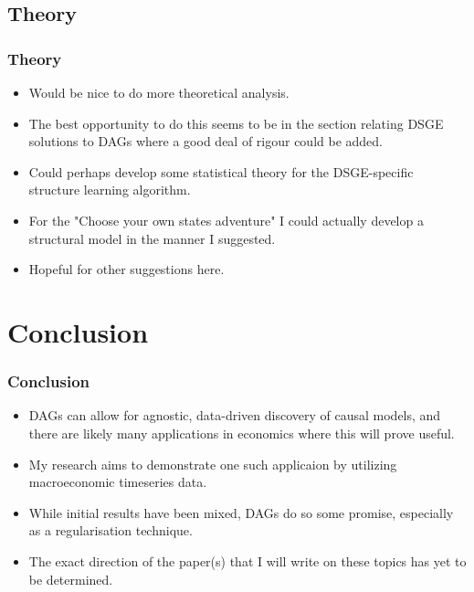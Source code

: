 \documentclass{beamer}
\begin{document}
\subsection{Theory}
\begin{frame}
    \frametitle{Theory}
    \begin{itemize}
        \item Would be nice to do more theoretical analysis.
        \item The best opportunity to do this seems to be in the section relating DSGE solutions to DAGs where a good deal of rigour could be added.
        \item Could perhaps develop some statistical theory for the DSGE-specific structure learning algorithm.
        \item For the "Choose your own states adventure" I could actually develop a structural model in the manner I suggested. 
        \item Hopeful for other suggestions here.
    \end{itemize}
\end{frame}

\section{Conclusion}
\begin{frame}
    \frametitle{Conclusion}
    \begin{itemize}
        \item DAGs can allow for agnostic, data-driven discovery of causal models, and there are likely many applications in economics where this will prove useful.
        \item My research aims to demonstrate one such applicaion by utilizing macroeconomic timeseries data.
        \item While initial results have been mixed, DAGs do so some promise, especially as a regularisation technique.
        \item The exact direction of the paper(s) that I will write on these topics has yet to be determined.
    \end{itemize}
\end{frame}
\end{document}
